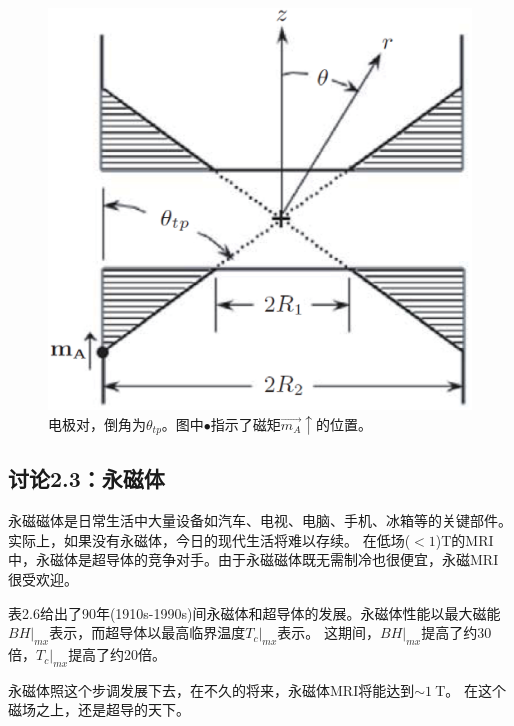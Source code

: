 \begin{figure}[htbp]
  \centering
 \includegraphics[scale=0.3]{chpt2/figs/fig2.8.eps}
  \caption{电极对，倒角为$\theta_{tp}$。图中$\bullet$指示了磁矩$\vec{m_A}\uparrow$的位置。}
\end{figure}




\subsection{讨论2.3：永磁体}
永磁磁体是日常生活中大量设备如汽车、电视、电脑、手机、冰箱等的关键部件。实际上，如果没有永磁体，今日的现代生活将难以存续。
在低场($<1$)T的MRI中，永磁体是超导体的竞争对手。由于永磁磁体既无需制冷也很便宜，永磁MRI很受欢迎。

表2.6给出了90年(1910s-1990s)间永磁体和超导体的发展。永磁体性能以最大磁能$BH|_{mx}$表示，而超导体以最高临界温度$T_c|_{mx}$表示。
这期间，$BH|_{mx}$提高了约30倍，$T_c|_{mx}$提高了约20倍。

永磁体照这个步调发展下去，在不久的将来，永磁体MRI将能达到$\sim 1\ $T。
在这个磁场之上，还是超导的天下。

